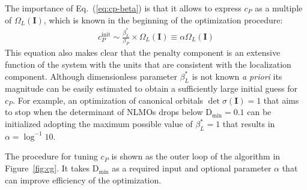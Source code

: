 \documentclass[aps,prl,reprint,amsmath,amssymb]{revtex4-1}
\begin{document}
The importance of Eq.~(\ref{eq:cp-beta}) is that it allows to express $c_P$ as a multiple of $\Omega_L(\mathbf{I})$, which is known in the beginning of the optimization procedure:
%
\begin{equation} \label{eq:cp-alpha}
\begin{split}
c_{P}^{\text{init}} \sim \frac{ \beta_L^{\ast} }{ \beta_P } \times \Omega_L(\mathbf{I}) \equiv \alpha \Omega_L(\mathbf{I})
\end{split}
\end{equation}
%
This equation also makes clear that the penalty component is an extensive function of the system with the units that are consistent with the localization component. Although dimensionless parameter $\beta_L^{\ast}$ is not known \emph{a priori} its magnitude can be easily estimated to obtain a sufficiently large initial guess for $c_P$. For example, an optimization of canonical orbitals $\det \sigma(\mathbf{I})=1$ that aims to stop when the determinant of NLMOs drops below $\text{D}_{\text{min}} = 0.1$ can be initialized adopting the maximum possible value of $\beta_L^{\ast} = 1$ that results in $\alpha = \log^{-1} 10$.

The procedure for tuning $c_P$ is shown as the outer loop of the algorithm in Figure~\ref{fig:cg}. It takes $\text{D}_{\text{min}}$ as a required input and optional parameter $\alpha$ that can improve efficiency of the optimization. %



\end{document}
